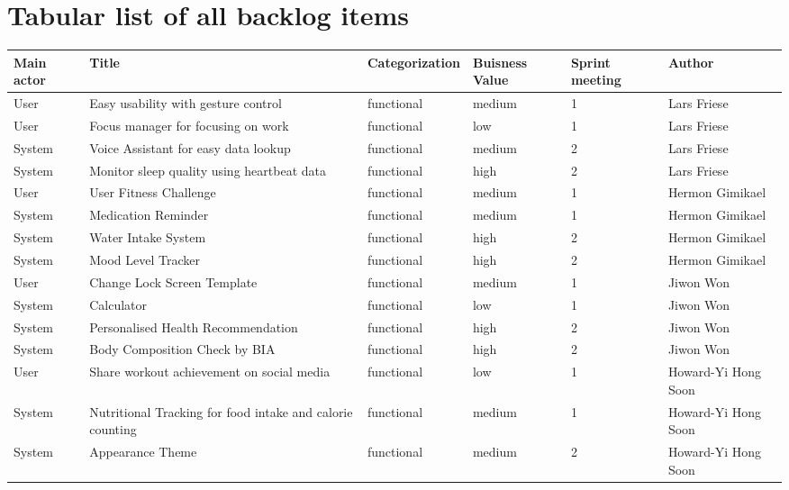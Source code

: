 \documentclass{article}
\begin{document}
\section{Tabular list of all backlog items}
\begin{center}
	\small
	\vspace{0cm}
	\begin{tabularx}{\textwidth}{|p{}|X|p{}|p{}|p{}|p{}|}
		\hline
		\textbf{Main actor} & \textbf{Title} & \textbf{Categorization} & \textbf{Buisness Value} & \textbf{Sprint meeting} & \textbf{Author} \\
		\hline
		User & Easy usability with gesture control & functional & medium & 1 & Lars Friese \\ \hline
		User & Focus manager for focusing on work & functional & low & 1 & Lars Friese \\ \hline
		System & Voice Assistant for easy data lookup & functional & medium & 2 & Lars Friese \\ \hline
		System & Monitor sleep quality using heartbeat data & functional & high & 2 & Lars Friese \\ \hline
        User & User Fitness Challenge & functional & medium & 1 & Hermon Gimikael \\ \hline
		System & Medication Reminder & functional & medium & 1 & Hermon Gimikael \\ \hline
		System & Water Intake System & functional & high & 2 & Hermon Gimikael \\ \hline
		System & Mood Level Tracker & functional & high & 2 & Hermon Gimikael \\ \hline
		User & Change Lock Screen Template & functional & medium &  1 & Jiwon Won \\ \hline
		System & Calculator & functional & low &  1 & Jiwon Won \\ \hline
		System & Personalised Health Recommendation & functional & high &  2 & Jiwon Won \\ \hline 
		System & Body Composition Check by BIA & functional & high &  2 & Jiwon Won \\ \hline
        User & Share workout achievement on social media & functional & low & 1 & Howard-Yi Hong Soon \\ \hline
        System & Nutritional Tracking for food intake and calorie counting & functional & medium & 1 & Howard-Yi Hong Soon \\ \hline
        System & Appearance Theme & functional & medium & 2 & Howard-Yi Hong Soon \\ \hline

\end{tabularx}
\end{center}
\end{document}
